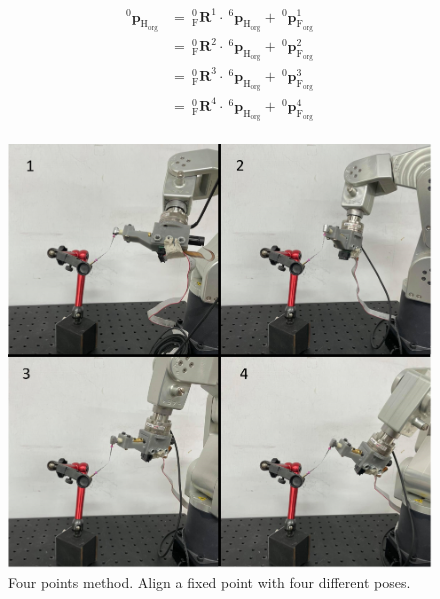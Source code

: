 \begin{equation}
\begin{split}																									
^\mathrm{0}\!\boldsymbol{p}_\mathrm{H_{org}}&=\  _{\mathrm{F}}^{\mathrm{0}}\mathbf{R}^1 \cdot\ ^\mathrm{6}\!\boldsymbol{p}_\mathrm{H_{org}} +\ ^\mathrm{0}\!\boldsymbol{p}_\mathrm{F_{org}}^1\\
					  						&=\  _{\mathrm{F}}^{\mathrm{0}}\mathbf{R}^2 \cdot\ ^\mathrm{6}\!\boldsymbol{p}_\mathrm{H_{org}} +\ ^\mathrm{0}\!\boldsymbol{p}_\mathrm{F_{org}}^2\\
					  						&=\  _{\mathrm{F}}^{\mathrm{0}}\mathbf{R}^3 \cdot\ ^\mathrm{6}\!\boldsymbol{p}_\mathrm{H_{org}} +\ ^\mathrm{0}\!\boldsymbol{p}_\mathrm{F_{org}}^3\\
					 					 	&=\  _{\mathrm{F}}^{\mathrm{0}}\mathbf{R}^4 \cdot\ ^\mathrm{6}\!\boldsymbol{p}_\mathrm{H_{org}} +\ ^\mathrm{0}\!\boldsymbol{p}_\mathrm{F_{org}}^4\\
\end{split}\label{eq:four-points}
\end{equation}
\begin{figure}[htbp]
\begin{center}
\includegraphics[width=0.55\linewidth]{Images/four point.png}
\caption{
Four points method. Align a fixed point with four different poses.
}\label{fig:four point}
\end{center}
\end{figure}
